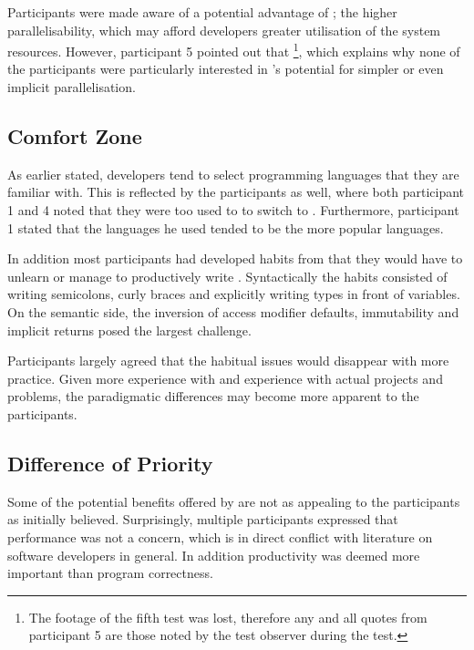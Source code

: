 Participants were made aware of a potential advantage of \fs; the higher parallelisability, which may afford developers greater utilisation of the system resources. However, participant 5 pointed out that \footnote{The footage of the fifth test was lost, therefore any and all quotes from participant 5 are those noted by the test observer during the test.}, which explains why none of the participants were particularly interested in \fs's potential for simpler or even implicit parallelisation.

\subsection{Comfort Zone}
As earlier stated, developers tend to select programming languages that they are familiar with\cite{meyerovich2013empirical}. This is reflected by the participants as well, where both participant 1 and 4 noted that they were too used to \cs to switch to \fs. Furthermore, participant 1 stated that the languages he used tended to be the more popular languages.


In addition most participants had developed habits from \cs that they would have to unlearn or manage to productively write \fs. Syntactically the habits consisted of writing semicolons, curly braces and explicitly writing types in front of variables. On the semantic side, the inversion of access modifier defaults, immutability and implicit returns posed the largest challenge.



Participants largely agreed that the habitual issues would disappear with more practice. Given more experience with \fs and experience with actual projects and problems, the paradigmatic differences may become more apparent to the participants.

\subsection{Difference of Priority}\label{sec:diff-pri}
Some of the potential benefits offered by \fs are not as appealing to the participants as initially believed. Surprisingly, multiple  participants expressed that performance was not a concern, which is in direct conflict with literature on software developers in general\cite{meyerovich2013empirical}. In addition productivity was deemed more important than program correctness.

